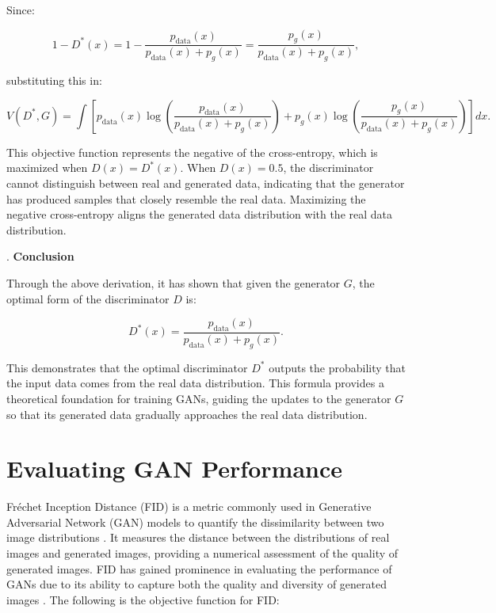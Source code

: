 Since:

\begin{equation}
    1 - D^*(x) = 1 - \frac{p_{\text{data}}(x)}{p_{\text{data}}(x) + p_g(x)} = \frac{p_g(x)}{p_{\text{data}}(x) + p_g(x)},
\end{equation}

substituting this in:

\begin{equation}
    V(D^*, G) = \int \left[ p_{\text{data}}(x) \log \left( \frac{p_{\text{data}}(x)}{p_{\text{data}}(x) + p_g(x)} \right) + p_g(x) \log \left( \frac{p_g(x)}{p_{\text{data}}(x) + p_g(x)} \right) \right] dx.
\end{equation}

This objective function represents the negative of the cross-entropy, which is maximized when $D(x) = D^*(x)$. When $D(x) = 0.5$, the discriminator cannot distinguish between real and generated data, indicating that the generator has produced samples that closely resemble the real data. Maximizing the negative cross-entropy aligns the generated data distribution with the real data distribution.

. \textbf{Conclusion}

Through the above derivation, it has shown that given the generator \( G \), the optimal form of the discriminator \( D \) is:

\begin{equation}
    D^*(x) = \frac{p_{\text{data}}(x)}{p_{\text{data}}(x) + p_g(x)}.
\end{equation}

This demonstrates that the optimal discriminator \( D^* \) outputs the probability that the input data comes from the 
real data distribution. 
This formula provides a theoretical foundation for training GANs, guiding the updates to the generator \( G \) so that 
its generated data gradually approaches the real data distribution.


\section{Evaluating GAN Performance}


Fréchet Inception Distance (FID) is a metric commonly used in Generative Adversarial Network (GAN) models 
to quantify the dissimilarity between two image distributions \citep{10.48550/arxiv.2203.06026}. 
It measures the distance between the distributions of real images and generated images, providing 
a numerical assessment of the quality of generated images. FID has gained prominence in evaluating 
the performance of GANs due to its ability to capture both the quality and diversity of generated images \citep{10.3390/app12157599}.
The following is the objective function for FID:


